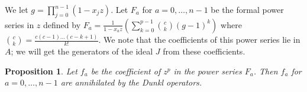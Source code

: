 \documentclass{article}
\numberwithin{equation}{section}
\newtheorem{proposition}[equation]{Proposition}
\begin{document}




We let $g=\prod_{j=0}^{n-1} (1-x_jz)$. Let $F_a$ for $a=0,\dots,n-1$ be the formal power series in $z$ defined by $F_a=\frac{1}{1-x_az} \left( \sum_{k=0}^{p-1} \binom{c}{k}(g-1)^k\right)$ where $\binom{c}{k}=\frac{c(c-1)\dots(c-k+1)}{k!}$. We note that the coefficients of this power series lie in $A$; we will get the generators of the ideal $J$ from these coefficients. 

\begin{proposition} Let $f_a$ be the coefficient of $z^p$ in the power series $F_a$. Then $f_a$ for $a=0,\dots,n-1$ are annihilated by the Dunkl operators. 
\end{proposition}
\end{document}
